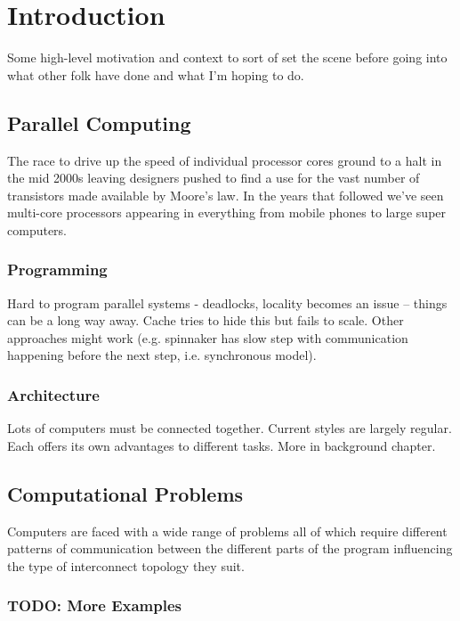 \chapter{Introduction}
	
	Some high-level motivation and context to sort of set the scene before going
	into what other folk have done and what I'm hoping to do.
	
	\section{Parallel Computing}
		
		The race to drive up the speed of individual processor cores ground to a
		halt in the mid 2000s leaving designers pushed to find a use for the vast
		number of transistors made available by Moore's law. In the years that
		followed we've seen multi-core processors appearing in everything from
		mobile phones to large super computers.
		
		\subsection{Programming}
			
			Hard to program parallel systems - deadlocks, locality becomes an issue --
			things can be a long way away. Cache tries to hide this but fails to
			scale. Other approaches might work (e.g. spinnaker has slow step with
			communication happening before the next step, i.e. synchronous model).
		
		\subsection{Architecture}
			
			Lots of computers must be connected together. Current styles are largely
			regular. Each offers its own advantages to different tasks. More in
			background chapter.
	
	\section{Computational Problems}
		
		Computers are faced with a wide range of problems all of which require
		different patterns of communication between the different parts of the
		program influencing the type of interconnect topology they suit.
		
		\subsection{TODO: More Examples}
		
